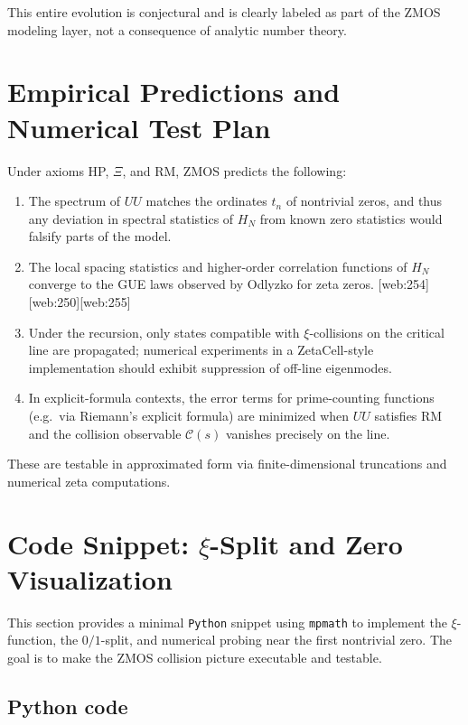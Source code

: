 \documentclass[11pt]{article}
\begin{document}
This entire evolution is conjectural and is clearly labeled as part of the ZMOS modeling layer, not a consequence of analytic number theory.

\section{Empirical Predictions and Numerical Test Plan}

Under axioms HP, $\Xi$, and RM, ZMOS predicts the following:

\begin{enumerate}
  \item The spectrum of $UU$ matches the ordinates $t_n$ of nontrivial zeros, and thus any deviation in spectral statistics of $H_N$ from known zero statistics would falsify parts of the model.
  \item The local spacing statistics and higher-order correlation functions of $H_N$ converge to the GUE laws observed by Odlyzko for zeta zeros. [web:254][web:250][web:255]
  \item Under the recursion, only states compatible with $\xi$-collisions on the critical line are propagated; numerical experiments in a ZetaCell-style implementation should exhibit suppression of off-line eigenmodes.
  \item In explicit-formula contexts, the error terms for prime-counting functions (e.g.\ via Riemann's explicit formula) are minimized when $UU$ satisfies RM and the collision observable $\mathcal{C}(s)$ vanishes precisely on the line.
\end{enumerate}

These are testable in approximated form via finite-dimensional truncations and numerical zeta computations.

\section{Code Snippet: $\xi$-Split and Zero Visualization}

This section provides a minimal \texttt{Python} snippet using \texttt{mpmath} to implement the $\xi$-function, the $0/1$-split, and numerical probing near the first nontrivial zero.  The goal is to make the ZMOS collision picture executable and testable.

\subsection{Python code}
\end{document}
